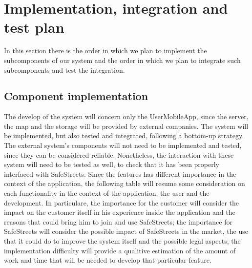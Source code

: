 \documentclass[../RASD.tex]{subfiles}
\begin{document}
    \chapter{Implementation, integration and test plan}\label{ch:implementation,-integration-and-test-plan}
    In this section there is the order in which we plan to implement the subcomponents of our system and the order in which we plan to integrate such subcomponents and test the integration.
    \section{Component implementation}\label{sec:component-implementation}
    The develop of the system will concern only the UserMobileApp, since the server, the map and the storage will be provided by external companies. The system will be implemented, but also tested and integrated, following a bottom-up strategy.
    The external system’s components will not need to be implemented and tested, since they can be considered reliable. Nonetheless, the interaction with these system will need to be tested as well, to check that it has been properly interfaced with SafeStreets.
    Since the features has different importance in the context of the application, the following table will resume some consideration on each functionality in the context of the application, the user and the development. In particulare, the importance for the customer will consider the impact on the customer itself in his experience inside the application and the reasons that could bring him to join and use SafeStreets; the importance for SafeStreets will consider the possible impact of SafeStreets in the market, the use that it could do to improve the system itself and the possible legal aspects; the implementation difficulty will provide a qualitive estimation of the amount of work and time that will be needed to develop that particular feature.
\end{document}
